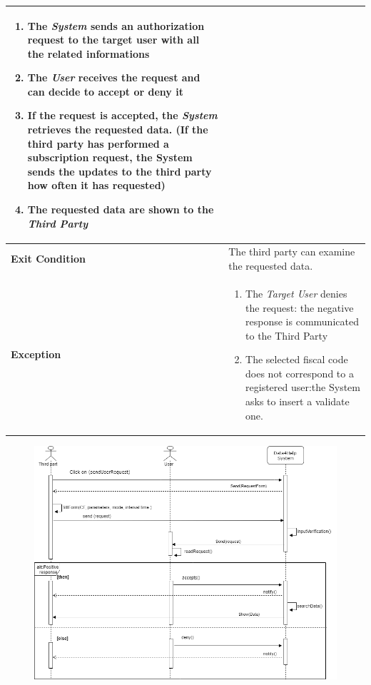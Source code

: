 \begin{table}[H]
\begin{tabular}{|p{3.5cm}|p{10.3cm}|}
\begin{enumerate}[leftmargin=0.5cm]
                            \item The \emph{System} sends an authorization request to the target user with all the related informations
                                            
                                            \item  The  \emph{User} receives the request and can decide to accept or deny it
                                            \item If the request is accepted, the \emph{System} retrieves the requested data. (If the third party has performed a subscription request, the System sends the updates to the third party how often it has requested)
                                            \item The requested data are shown to the \emph{Third Party}
                                
                                          \end{enumerate}
    										\\
    \hline
    \textbf{\large{Exit Condition}} 	& The third party can examine the requested data. \\
    
    \hline
    \textbf{\large{Exception}} 			& \begin{enumerate}[leftmargin=0.5cm]
                                          	\item The \emph{Target User} denies the request: the negative response is communicated to the Third Party
                                          	\item The selected fiscal code does not correspond to a registered user:the System asks to insert a validate one.
	\end{enumerate}\\
    
    \hline
    
    
    \end{tabular}
	
\end{table}

\begin{figure}[H]
    \centering
    \includegraphics[scale=0.4]{rasdL/Pictures/request1.png}
  
\end{figure}